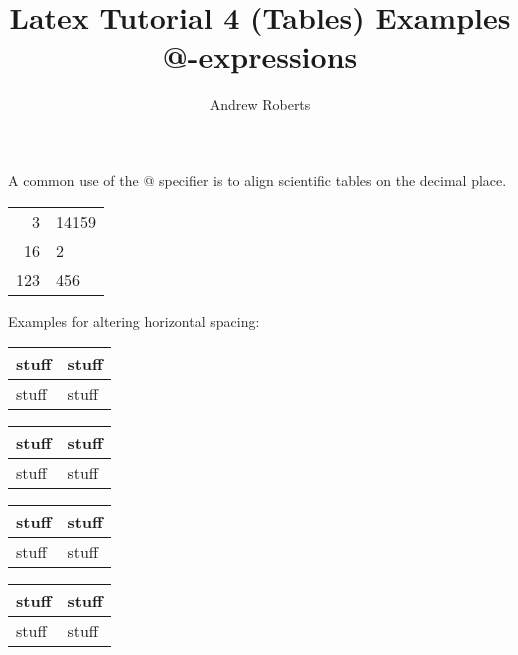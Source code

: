 \documentclass[english]{article}
\begin{document}
\title{Latex Tutorial 4 (Tables) Examples \\
       @-expressions}

\author{Andrew Roberts}
\maketitle


A common use of the @ specifier is to align scientific tables on the
decimal place.

\vspace{\baselineskip}

\begin{tabular}{r@{.}l}
3&14159\\
16&2\\
123&456\\
\end{tabular}

\vspace{\baselineskip}

Examples for altering horizontal spacing:

\vspace{\baselineskip}

\begin{tabular}{| l | l |}
\hline
stuff & stuff \\ \hline
stuff & stuff \\
\hline
\end{tabular}

\vspace{\baselineskip}

\begin{tabular}{|@{}l|l@{}|}
\hline
stuff & stuff \\ \hline
stuff & stuff \\
\hline
\end{tabular}

\vspace{\baselineskip}

\begin{tabular}{|@{}l@{}|l@{}|}
\hline
stuff & stuff \\ \hline
stuff & stuff \\
\hline
\end{tabular}

\vspace{\baselineskip}

\begin{tabular}{|@{}l@{}|@{}l@{}|}
\hline
stuff & stuff \\ \hline
stuff & stuff \\
\hline
\end{tabular}
\end{document}

